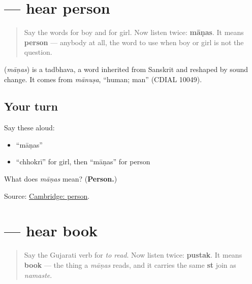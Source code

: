 \section[\texorpdfstring{\gu{માણસ} (māṇas)}{માણસ (māṇas)}]{ — hear person}

\label{lesson:GU-C30-hear-maanas}



\begin{quote}
Say the words for boy and for girl. Now listen twice: \textbf{māṇas}. It means \textbf{person} — anybody at all, the word to use when boy or girl is not the question.
\end{quote}

\begin{cousinweb}
\textbf{} (\emph{māṇas}) is a tadbhava, a word inherited from Sanskrit and reshaped by sound change. It comes from \emph{mānuṣa}, \textquotedblleft{}human; man\textquotedblright{} (CDIAL 10049).
\end{cousinweb}

\subsection*{Your turn}
Say these aloud:

\begin{itemize}
\raggedright
  \item \textquotedblleft{}māṇas\textquotedblright{}
  \item \textquotedblleft{}chhokrī\textquotedblright{} for girl, then \textquotedblleft{}māṇas\textquotedblright{} for person
\end{itemize}

\begin{tcolorbox}[breakable,colback=teal!4,colframe=teal!35!black,title={Before you move on}]
What does \emph{māṇas} mean? (\textbf{Person.})

Source: \href{https://dictionary.cambridge.org/dictionary/english-gujarati/person}{Cambridge: person}.
\end{tcolorbox}
\section[\texorpdfstring{\gu{પુસ્તક} (pustak)}{પુસ્તક (pustak)}]{ — hear book}

\label{lesson:GU-C30-hear-pustak}



\begin{quote}
Say the Gujarati verb for \emph{to read}. Now listen twice: \textbf{pustak}. It means \textbf{book} — the thing a \emph{māṇas} reads, and it carries the same \textbf{st} join as \emph{namaste}.
\end{quote}

